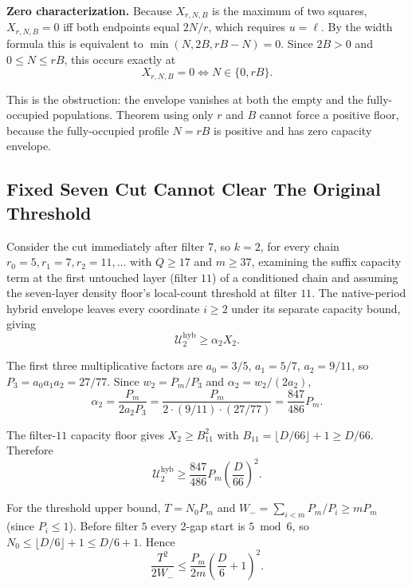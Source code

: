 \textbf{Zero characterization.} Because $X_{r,N,B}$ is the maximum of two squares,
$X_{r,N,B}=0$ iff both endpoints equal $2N/r$, which requires $u=\ell$. By the
width formula this is equivalent to $\min(N,2B,rB-N)=0$. Since $2B>0$ and
$0\le N\le rB$, this occurs exactly at
\begin{equation*}
X_{r,N,B}=0\iff N\in\{0,rB\}.
\end{equation*}

This is the obstruction: the envelope vanishes at both the empty and the
fully-occupied populations. Theorem using only $r$ and $B$ cannot force a
positive floor, because the fully-occupied profile $N=rB$ is positive and has
zero capacity envelope.

\subsection{Fixed Seven Cut Cannot Clear The Original Threshold}
\label{sec:appendix-c-3}

Consider the cut immediately after filter $7$, so $k=2$, for every chain
$r_0=5,r_1=7,r_2=11,\ldots$ with $Q\ge17$ and $m\ge37$, examining the suffix
capacity term at the first untouched layer (filter $11$) of a conditioned
chain and assuming the seven-layer density floor's local-count threshold at
filter $11$. The native-period
hybrid envelope leaves every coordinate $i\ge2$ under its separate capacity
bound, giving
\begin{equation*}
\mathcal U_2^{\mathrm{hyb}}\ge\alpha_2X_2.
\end{equation*}

The first three multiplicative factors are $a_0=3/5$, $a_1=5/7$, $a_2=9/11$,
so $P_3=a_0a_1a_2=27/77$. Since $w_2=P_m/P_3$ and $\alpha_2=w_2/(2a_2)$,
\begin{equation*}
\alpha_2=\frac{P_m}{2a_2P_3}=\frac{P_m}{2\cdot(9/11)\cdot(27/77)}
=\frac{847}{486}P_m.
\end{equation*}

The filter-$11$ capacity floor gives $X_2\ge B_{11}^2$ with
$B_{11}=\lfloor D/66\rfloor+1\ge D/66$. Therefore
\begin{equation*}
\mathcal U_2^{\mathrm{hyb}}\ge\frac{847}{486}P_m\left(\frac{D}{66}\right)^2.
\end{equation*}

For the threshold upper bound, $T=N_0P_m$ and $W_-=\sum_{i<m}P_m/P_i\ge mP_m$
(since $P_i\le1$). Before filter $5$ every 2-gap start is $5\bmod6$, so
$N_0\le\lfloor D/6\rfloor+1\le D/6+1$. Hence
\begin{equation*}
\frac{T^2}{2W_-}\le\frac{P_m}{2m}\left(\frac D6+1\right)^2.
\end{equation*}

